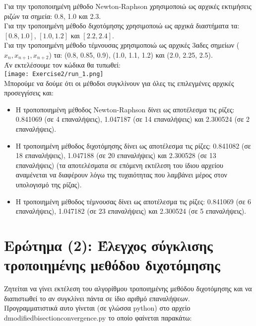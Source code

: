 \documentclass[a4paper,11pt]{article}
\newcommand{\lt}{\latintext}
\newcommand{\gt}{\greektext}
\begin{document}
Για την τροποποιημένη μέθοδο {\lt Newton-Raphson} χρησιμοποιώ ως αρχικές εκτιμήσεις ριζών τα σημεία: 0.8, 1.0 και 2.3.\\
Για την τροποιημένη μέθοδο διχοτόμησης χρησιμοποιώ ως αρχικά διαστήματα τα: $[0.8, 1.0]$, $[1.0, 1.2]$ και $[2.2, 2.4]$.\\
Για την τροποιημένη μέθοδο τέμνουσας χρησιμοποιώ ως αρχικές 3αδες σημείων ({\lt $x_n, x_{n+1}, x_{n+2}$}) τα: (0.8, 0.85, 0.9), (1.0, 1.1, 1.2) και (2.0, 2.25, 2.5).\\

Άν εκτελέσουμε τον κώδικα θα τυπωθεί:\\
\texttt{[image: Exercise2/run\_1.png]}\\
Μπορούμε να δούμε ότι οι μέθοδοι συγκλίνουν για όλες τις επιλεγμένες αρχικές προσεγγίσεις και:
\begin{itemize}
    \item Η τροποποιημένη μέθοδος {\lt Newton-Raphson} δίνει ως αποτέλεσμα τις ρίζες: 0.841069 (σε 4 επαναλήψεις), 1.047187 (σε 14 επαναλήψεις) και 2.300524 (σε 2 επαναλήψεις).
    \item Η τροποιημένη μέθοδος διχοτόμησης δίνει ως αποτέλεσμα τις ρίζες: 0.841082 (σε 18 επαναλήψεις), 1.047188 (σε 20 επαναλήψεις) και 2.300528 (σε 13 επαναλήψεις) (τα αποτελέσματα σε επόμενη εκτέλεση του ίδιου αρχείου αναμένεται να διαφέρουν λόγω της τυχαιότητας που λαμβάνει μέρος στον υπολογισμό της ρίζας).
    \item Η τροποιημένη μέθοδος τέμνουσας δίνει ως αποτέλεσμα τις ρίζες: 0.841069 (σε 6 επαναλήψεις), 1.047182 (σε 23 επαναλήψεις) και 2.300524 (σε 5 επαναλήψεις).
\end{itemize}

\section{Ερώτημα (2): Έλεγχος σύγκλισης τροποιημένης μεθόδου διχοτόμησης}
Ζητείται να γίνει εκτέλεση του αλγορίθμου τροποιημένης μεθόδου διχοτόμησης και να διαπιστωθεί το αν συγκλίνει πάντα σε ίδιο αριθμό επαναλήψεων.\\

Προγραμματιστικά αυτο γίνεται (σε γλώσσα {\lt python}) στο αρχείο\\ {\lt d\textunderscore modified\textunderscore bisection\textunderscore convergence.py} το οποίο φαίνεται παρακάτω:\\
\lt

\gt
\end{document}
